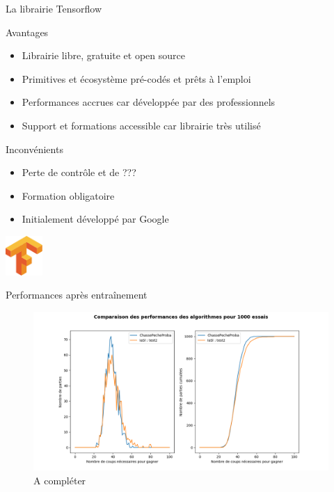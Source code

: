 	\begin{frame}{La librairie Tensorflow}
		\begin{block}{Avantages}
		    \begin{itemize}
		        \item Librairie libre, gratuite et open source
		        \item Primitives et écosystème pré-codés et prêts à l'emploi
		        \item Performances accrues car développée par des professionnels
		        \item Support et formations accessible car librairie très utilisé
		    \end{itemize}{}
		\end{block}
		\begin{minipage}[c]{0.68\linewidth}
		    \begin{block}{Inconvénients}
        	    \begin{itemize}
        	        \item Perte de contrôle et de ??? %
        	        \item Formation obligatoire
        	        \item Initialement développé par Google
        	    \end{itemize}{}
		    \end{block}
        \end{minipage}
        \begin{minipage}[c]{0.30\linewidth}
            \centering
            \includegraphics[height=1.5cm]{images/tflogo.png}
        \end{minipage}
	\end{frame}
	
	\begin{frame}{Performances après entraînement}
	    \begin{figure}
	        \centering
	        \includegraphics[width=.95\linewidth]{images/perfiasl4.png} %
	        \caption*{A compléter}
	        \label{fig:perfstf}
	    \end{figure}{}
	\end{frame}{}


